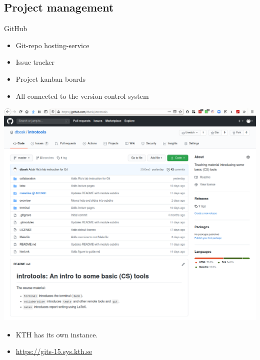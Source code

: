 \subsection{Project management}

\begin{frame}
  \begin{block}{GitHub}
    \begin{itemize}
      \item Git-repo hosting-service
      \item Issue tracker
      \item Project kanban boards
      \item All connected to the version control system
    \end{itemize}
  \end{block}
\end{frame}

\begin{frame}
  \centering
  \includegraphics[height=\textheight]{figs/github-introtools.png}
\end{frame}

\begin{frame}
  \begin{remark}
    \begin{itemize}
      \item KTH has its own instance.
      \item \url{https://gits-15.sys.kth.se}
    \end{itemize}
  \end{remark}
\end{frame}


